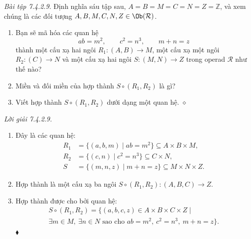 \noindent\textit{Bài tập 7.4.2.9.}\keepwithnext
Định nghĩa sáu tập sau, $A=B=M=C=N=Z=\mathbb Z$, và xem chúng là các đối tượng $A,B,M,C,N,Z\in\Ob(\mathcal R)$.
\begin{enumerate}[label=\alph*.]
\item Bạn sẽ mã hóa các quan hệ
\[
ab=m^2,\qquad c^2=n^3,\qquad m+n=z
\]
thành một cấu xạ hai ngôi $R_1:(A,B)\to M$, một cấu xạ một ngôi $R_2:(C)\to N$ và một cấu xạ hai ngôi $S:(M,N)\to Z$ trong operad $\mathcal R$ như thế nào?
\item Miền và đối miền của hợp thành $S\circ(R_1,R_2)$ là gì?
\item Viết hợp thành $S\circ(R_1,R_2)$ dưới dạng một quan hệ.
\nobreak\hfill$\diamond$
\end{enumerate}

\noindent\textit{Lời giải 7.4.2.9.}\keepwithnext
\begin{enumerate}[label=\alph*.]
\item Đây là các quan hệ:
\[
\begin{aligned}
R_1&=\{(a,b,m)\mid ab=m^2\}\subseteq A\times B\times M,\\
R_2&=\{(c,n)\mid c^2=n^3\}\subseteq C\times N,\\
S&=\{(m,n,z)\mid m+n=z\}\subseteq M\times N\times Z.
\end{aligned}
\]
\item Hợp thành là một cấu xạ ba ngôi $S\circ(R_1,R_2):(A,B,C)\to Z$.
\item Hợp thành được cho bởi quan hệ:
\[
\begin{aligned}
S\circ(R_1,R_2)=\{(a,b,c,z)\in A\times B\times C\times Z\mid\qquad\\
\exists m\in M,\ \exists n\in N\text{ sao cho }ab=m^2,\ c^2=n^3,\ m+n=z\}.
\end{aligned}
\]
\nobreak\hfill$\blacklozenge$
\end{enumerate}

